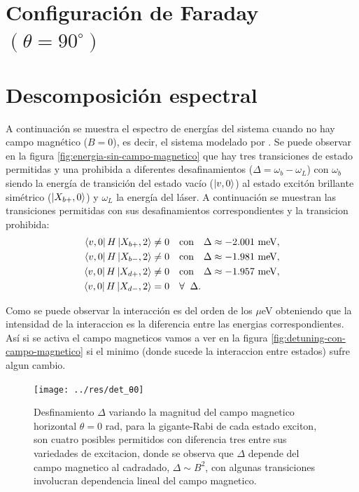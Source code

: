 \documentclass[main.tex]{subfiles}
\begin{document}
\section{Configuraci\'on de Faraday $(\theta = 90^\circ)$}

\section{Descomposici\'on espectral}

A continuaci\'on se muestra el espectro de energ\'ias del sistema cuando no hay campo magn\'etico ($B=0$), es decir, el sistema modelado por \parencite{Vargas2022}. Se puede observar en la figura \ref{fig:energia-sin-campo-magnetico} que hay tres transiciones de estado permitidas y una prohibida a diferentes desafinamientos ($\Delta = \omega_b-\omega_L$) con $\omega_b$ siendo la energ\'ia de transici\'on del estado vac\'io ($\ket{v,0}$) al estado excit\'on brillante sim\'etrico ($\ket{X_{b+},0}$) y $\omega_L$ la energ\'ia del l\'aser. A continuaci\'on se muestran las transiciones permitidas con sus desafinamientos correspondientes y la transicion prohibida:
\begin{align}
	\bra{v,0}H\ket{X_{b+},2} &\neq 0 \quad \text{con} \quad \Delta \approx -2.001 \text{ meV},\\
	\bra{v,0}H\ket{X_{b-},2} &\neq 0 \quad \text{con} \quad \Delta \approx -1.981 \text{ meV},\\
	\bra{v,0}H\ket{X_{d+},2} &\neq 0 \quad \text{con} \quad \Delta \approx -1.957 \text{ meV},\\
	\bra{v,0}H\ket{X_{d-},2} &= 0 \quad \forall \;\; \Delta.
\end{align}



Como se puede observar la interacci\'on es del orden de los $\mu$eV obteniendo que la intensidad de la interaccion es la diferencia entre las energias correspondientes. As\'i si se activa el campo magneticos vamos a ver en la figura \ref{fig:detuning-con-campo-magnetico} si el minimo (donde sucede la interaccion entre estados) sufre algun cambio.

\begin{figure}[bh]
	\centering
	\texttt{[image: ../res/det\_θ0]}
	\caption{Desfinamiento $\Delta$ variando la magnitud del campo magnetico horizontal $\theta=0$ rad, para la gigante-Rabi de cada estado exciton, son cuatro posibles permitidos con diferencia tres entre sus variedades de excitacion, donde se observa que $\Delta$ depende del campo magnetico al cadradado, $\Delta \sim B^2$, con algunas transiciones involucran dependencia lineal del campo magnetico.}
	\label{fig:det_θ0}
\end{figure}
\end{document}
